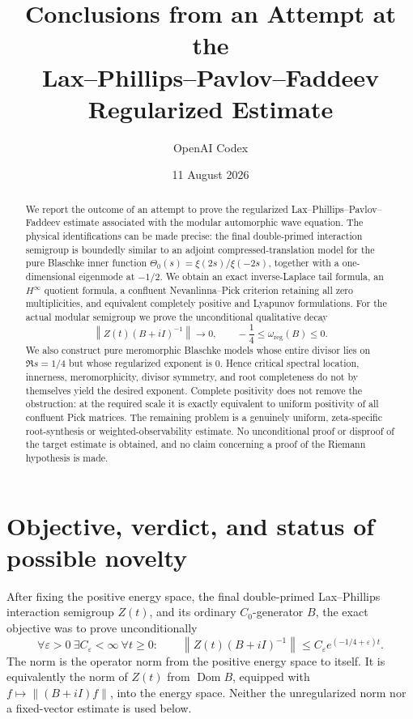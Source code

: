 \documentclass[11pt]{amsart}
\title[Conclusions on the Pavlov--Faddeev criterion]
{Conclusions from an Attempt at the\\
Lax--Phillips--Pavlov--Faddeev Regularized Estimate}
\author{OpenAI Codex}
\date{11 August 2026}
\theoremstyle{definition}
\theoremstyle{remark}
\DeclareMathOperator{\Dom}{Dom}
\newcommand{\eps}{\varepsilon}
\newcommand{\norm}[1]{\left\lVert #1\right\rVert}
\begin{document}
\raggedbottom

\begin{abstract}
We report the outcome of an attempt to prove the regularized
Lax--Phillips--Pavlov--Faddeev estimate associated with the modular
automorphic wave equation.  The physical identifications can be made precise:
the final double-primed interaction semigroup is boundedly similar to an
adjoint compressed-translation model for the pure Blaschke inner function
$\Theta_0(s)=\xi(2s)/\xi(-2s)$, together with a one-dimensional eigenmode at
$-1/2$.  We obtain an exact inverse-Laplace tail formula, an $H^\infty$
quotient formula, a confluent Nevanlinna--Pick criterion retaining all zero
multiplicities, and equivalent completely positive and Lyapunov formulations.
For the actual modular semigroup we prove the unconditional qualitative
decay
\[
 \norm{Z(t)(B+iI)^{-1}}\longrightarrow0,
 \qquad
 -\frac14\leq\omega_{\mathrm{reg}}(B)\leq0.
\]
We also construct pure meromorphic Blaschke models whose entire divisor lies
on $\Re s=1/4$ but whose regularized exponent is $0$.  Hence critical spectral
location, innerness, meromorphicity, divisor symmetry, and root completeness
do not by themselves yield the desired exponent.
Complete positivity does not remove the obstruction: at the required scale it
is exactly equivalent to uniform positivity of all confluent Pick matrices.
The remaining problem is a genuinely uniform, zeta-specific root-synthesis or
weighted-observability estimate.  No unconditional proof or disproof of the
target estimate is obtained, and no claim concerning a proof of the Riemann
hypothesis is made.
\end{abstract}

\maketitle

\tableofcontents

\section{Objective, verdict, and status of possible novelty}

After fixing the positive energy space, the final double-primed
Lax--Phillips interaction semigroup $Z(t)$, and its ordinary $C_0$-generator
$B$, the exact objective was to prove unconditionally
\begin{equation}\label{eq:objective}
 \forall\eps>0\ \exists C_\eps<\infty\ \forall t\geq0:
 \qquad
 \norm{Z(t)(B+iI)^{-1}}
 \leq C_\eps e^{(-1/4+\eps)t}.
\end{equation}
The norm is the operator norm from the positive energy space to itself.  It is
equivalently the norm of $Z(t)$ from $\Dom B$, equipped with
$f\mapsto\norm{(B+iI)f}$, into the energy space.  Neither the
unregularized norm nor a fixed-vector estimate is used below.
\end{document}
